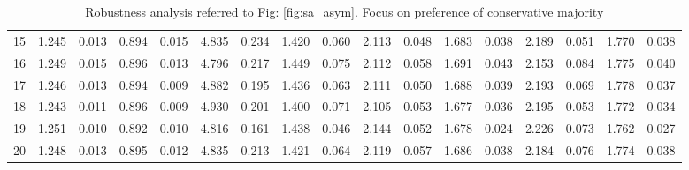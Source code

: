 \documentclass{article}
\begin{document}
\begin{table}[H]
{\begin{tabular}{|c|c|c|c|c|c|c|c|c|c|c|c|c|c|c|c|c|}
    15 & 1.245 & 0.013 & 0.894 & 0.015 & 4.835 & 0.234 & 1.420 & 0.060 & 2.113 & 0.048 & 1.683 & 0.038 & 2.189 & 0.051 & 1.770 & 0.038 \\ 
    16 & 1.249 & 0.015 & 0.896 & 0.013 & 4.796 & 0.217 & 1.449 & 0.075 & 2.112 & 0.058 & 1.691 & 0.043 & 2.153 & 0.084 & 1.775 & 0.040 \\ 
    17 & 1.246 & 0.013 & 0.894 & 0.009 & 4.882 & 0.195 & 1.436 & 0.063 & 2.111 & 0.050 & 1.688 & 0.039 & 2.193 & 0.069 & 1.778 & 0.037 \\ 
    18 & 1.243 & 0.011 & 0.896 & 0.009 & 4.930 & 0.201 & 1.400 & 0.071 & 2.105 & 0.053 & 1.677 & 0.036 & 2.195 & 0.053 & 1.772 & 0.034 \\ 
    19 & 1.251 & 0.010 & 0.892 & 0.010 & 4.816 & 0.161 & 1.438 & 0.046 & 2.144 & 0.052 & 1.678 & 0.024 & 2.226 & 0.073 & 1.762 & 0.027 \\ 
    20 & 1.248 & 0.013 & 0.895 & 0.012 & 4.835 & 0.213 & 1.421 & 0.064 & 2.119 & 0.057 & 1.686 & 0.038 & 2.184 & 0.076 & 1.774 & 0.038 \\ 
   \hline
\end{tabular}
}

\caption{Robustness analysis referred to Fig: \ref{fig:sa_asym}. Focus on preference of conservative majority}
\label{tab:sa_asym_etnclc}
\end{table}
\end{document}

